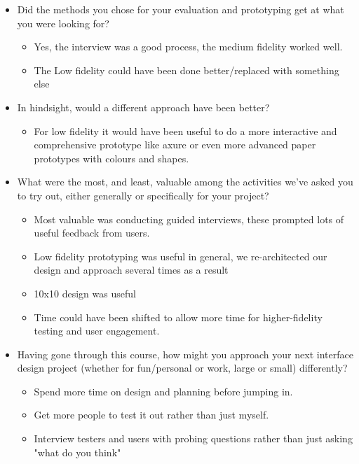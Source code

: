 \documentclass{chi2011}
\begin{document}
\begin{itemize}[noitemsep]
		\item Did the methods you chose for your evaluation and prototyping get at what you were looking for? 
		\begin{itemize}[noitemsep]
			\item Yes, the interview was a good process, the medium fidelity worked well.
			\item The Low fidelity could have been done better/replaced with something else
		\end{itemize}

		\item In hindsight, would a different approach have been better? 
		\begin{itemize}[noitemsep]
			\item For low fidelity it would have been useful to do a more interactive and comprehensive prototype like axure or 
				  even more advanced paper prototypes with colours and shapes.
		\end{itemize}

		\item What were the most, and least, valuable among the activities we’ve asked you to try out, either generally or 
			  specifically for your project?
		\begin{itemize}[noitemsep]
			\item Most valuable was conducting guided interviews, these prompted lots of useful feedback from users.
			\item Low fidelity prototyping was useful in general, we re-architected our design and approach several times as a result
			\item 10x10 design was useful
			\item Time could have been shifted to allow more time for higher-fidelity testing and user engagement.
		\end{itemize}

		\item Having gone through this course, how might you approach your next interface
			  design project (whether for fun/personal or work, large or small) differently?
		\begin{itemize}[noitemsep]
			\item  Spend more time on design and planning before jumping in.
			\item Get more people to test it out rather than just myself.
			\item Interview testers and users with probing questions rather than just asking "what do you think"
		\end{itemize}
	\end{itemize}
\end{document}
